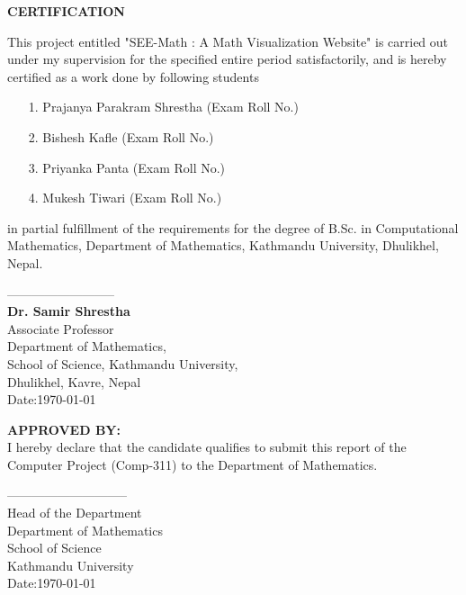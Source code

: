 



\begin{center}
	{\Large{\bf{ CERTIFICATION}}}
\end{center}


\noindent
This project entitled "SEE-Math : A Math Visualization Website" is carried out  under my supervision for the specified entire period satisfactorily, and is hereby certified as a work done by following students
\begin{itemize}
\item[1.] Prajanya Parakram Shrestha (Exam Roll No.)
\item[2.] Bishesh Kafle (Exam Roll No.)
\item[3.] Priyanka Panta (Exam Roll No.)
\item[4.] Mukesh Tiwari (Exam Roll No.)
\end{itemize}
 in partial fulfillment of the requirements for the degree of B.Sc. in Computational Mathematics, Department of Mathematics, Kathmandu University, Dhulikhel, Nepal.

\vspace{2.0cm}

\noindent
--------------------------\\
{\bf Dr. Samir Shrestha}\\
Associate Professor \\
Department of Mathematics,\\
School of Science, Kathmandu University,\\
Dhulikhel, Kavre, Nepal\\
Date:\today

\vspace{2cm}

\noindent
{\bf APPROVED BY:}\\
I hereby declare that the candidate qualifies to submit this  report of the Computer Project (Comp-311) to the Department of Mathematics. 



\vspace{2cm}

\noindent
-----------------------------\\
Head of the Department\\
Department of Mathematics\\
School of Science\\
Kathmandu University\\
Date:\today
  
